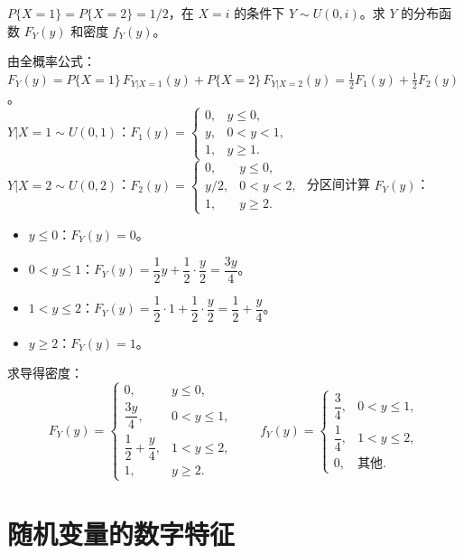 \documentclass[lang=cn,11pt]{elegantbook}
\begin{document}
\begin{exercise}[混合条件分布求 $F_Y$] \label{exer:3-c17}
$P\{X=1\} = P\{X=2\} = 1/2$，在 $X=i$ 的条件下 $Y \sim U(0,i)$。求 $Y$ 的分布函数 $F_Y(y)$ 和密度 $f_Y(y)$。
\end{exercise}
\begin{solution}
由全概率公式：$F_Y(y) = P\{X=1\}\,F_{Y|X=1}(y) + P\{X=2\}\,F_{Y|X=2}(y) = \frac{1}{2}F_1(y) + \frac{1}{2}F_2(y)$。\\
$Y|X=1 \sim U(0,1)$：$F_1(y) = \begin{cases} 0, & y \leqslant 0, \\ y, & 0 < y < 1, \\ 1, & y \geqslant 1. \end{cases}$\\
$Y|X=2 \sim U(0,2)$：$F_2(y) = \begin{cases} 0, & y \leqslant 0, \\ y/2, & 0 < y < 2, \\ 1, & y \geqslant 2. \end{cases}$
分区间计算 $F_Y(y)$：
\begin{itemize}
    \item $y \leqslant 0$：$F_Y(y) = 0$。
    \item $0 < y \leqslant 1$：$F_Y(y) = \dfrac{1}{2}y + \dfrac{1}{2}\cdot\dfrac{y}{2} = \dfrac{3y}{4}$。
    \item $1 < y \leqslant 2$：$F_Y(y) = \dfrac{1}{2}\cdot 1 + \dfrac{1}{2}\cdot\dfrac{y}{2} = \dfrac{1}{2} + \dfrac{y}{4}$。
    \item $y \geqslant 2$：$F_Y(y) = 1$。
\end{itemize}
求导得密度：
\[
F_Y(y) = \begin{cases} 0, & y \leqslant 0, \\ \dfrac{3y}{4}, & 0 < y \leqslant 1, \\ \dfrac{1}{2} + \dfrac{y}{4}, & 1 < y \leqslant 2, \\ 1, & y \geqslant 2. \end{cases}
\qquad
f_Y(y) = \begin{cases} \dfrac{3}{4}, & 0 < y \leqslant 1, \\ \dfrac{1}{4}, & 1 < y \leqslant 2, \\ 0, & \text{其他}. \end{cases}
\]
\end{solution}


\chapter{随机变量的数字特征}
\end{document}
